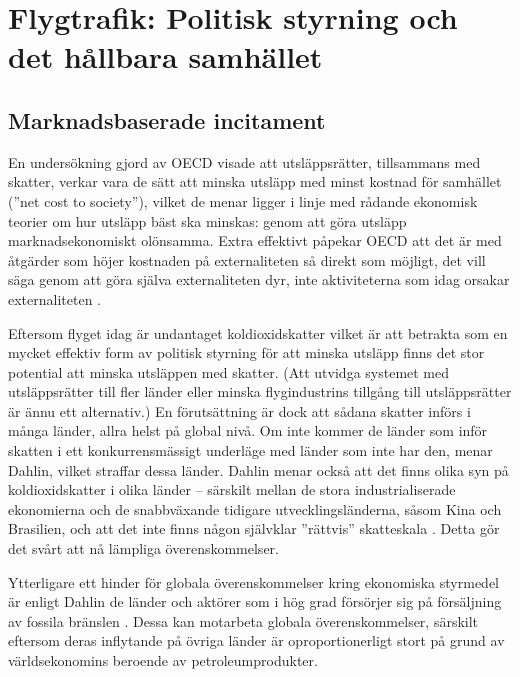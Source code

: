 \documentclass{article}
\begin{document}

\clearpage
\section{Flygtrafik: Politisk styrning och det hållbara samhället}

\subsection{Marknadsbaserade incitament}

En undersökning gjord av OECD visade att utsläppsrätter, tillsammans med skatter, verkar vara de  sätt att minska utsläpp med minst kostnad för samhället (''net cost to society''), vilket de menar ligger i linje med rådande ekonomisk teorier om hur utsläpp bäst ska minskas: genom att göra utsläpp marknadsekonomiskt olönsamma. Extra effektivt påpekar OECD att det är med åtgärder som höjer kostnaden på externaliteten så direkt som möjligt, det vill säga genom att göra själva externaliteten dyr, inte aktiviteterna som idag orsakar externaliteten .

Eftersom flyget idag är undantaget koldioxidskatter  vilket är att betrakta som en mycket effektiv form av politisk styrning för att minska utsläpp finns det stor potential att minska utsläppen med skatter. (Att utvidga systemet med utsläppsrätter till fler länder eller minska flygindustrins tillgång till utsläppsrätter är ännu ett alternativ.) En förutsättning är dock att sådana skatter införs i många länder, allra helst på global nivå. Om inte kommer de länder som inför skatten i ett konkurrensmässigt underläge med länder som inte har den, menar Dahlin, vilket straffar dessa länder. Dahlin menar också att det finns olika syn på koldioxidskatter i olika länder – särskilt mellan de stora industrialiserade ekonomierna och de snabbväxande tidigare utvecklingsländerna, såsom Kina och Brasilien, och att det inte finns någon självklar ''rättvis'' skatteskala . Detta gör det svårt att nå lämpliga överenskommelser.

Ytterligare ett hinder för globala överenskommelser kring ekonomiska styrmedel är enligt Dahlin de länder och aktörer som i hög grad försörjer sig på försäljning av fossila bränslen . Dessa kan motarbeta globala överenskommelser, särskilt eftersom deras inflytande på övriga länder är oproportionerligt stort på grund av världsekonomins beroende av petroleumprodukter.
\end{document}
